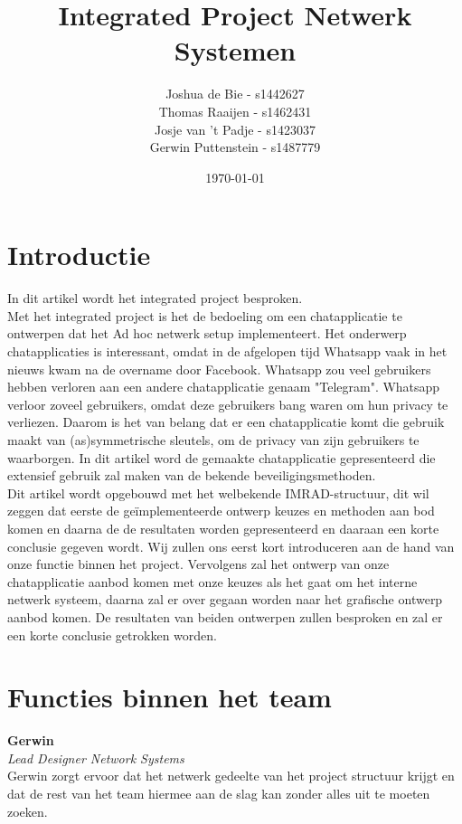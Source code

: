 \documentclass[12pt]{article}
\author{Joshua de Bie - s1442627\\Thomas Raaijen - s1462431\\Josje van 't Padje - s1423037\\Gerwin Puttenstein - s1487779}
\date{\today}
\title{Integrated Project Netwerk Systemen}
\begin{document}
\maketitle
\thispagestyle{empty}
\setcounter{page}{0}
\newpage

\tableofcontents
\newpage

\section{Introductie}
In dit artikel wordt het integrated project besproken.\\ Met het integrated project is het de bedoeling om een chatapplicatie te ontwerpen dat het Ad hoc netwerk setup implementeert. Het onderwerp chatapplicaties is interessant, omdat in de afgelopen tijd Whatsapp vaak in het nieuws kwam na de overname door Facebook. Whatsapp zou veel gebruikers hebben verloren aan een andere chatapplicatie genaam "Telegram". Whatsapp verloor zoveel gebruikers, omdat deze gebruikers bang waren om hun privacy te verliezen. Daarom is het van belang dat er een chatapplicatie komt die gebruik maakt van (as)symmetrische sleutels, om de privacy van zijn gebruikers te waarborgen. In dit artikel word de gemaakte chatapplicatie gepresenteerd die extensief gebruik zal maken van de bekende beveiligingsmethoden.\\
Dit artikel wordt opgebouwd met het welbekende IMRAD-structuur, dit wil zeggen dat eerste de ge\"implementeerde ontwerp keuzes en methoden aan bod komen en daarna de de resultaten worden gepresenteerd en daaraan een korte conclusie gegeven wordt. Wij zullen ons eerst kort introduceren aan de hand van onze functie binnen het project. Vervolgens zal het ontwerp van onze chatapplicatie aanbod komen met onze keuzes als het gaat om het interne netwerk systeem, daarna zal er over gegaan worden naar het grafische ontwerp aanbod komen. De resultaten van beiden ontwerpen zullen besproken en zal er een korte conclusie getrokken worden. 
\newpage

\section{Functies binnen het team}
\textbf{Gerwin} \\
\emph{Lead Designer Network Systems} \\
Gerwin zorgt ervoor dat het netwerk gedeelte van het project structuur krijgt en dat de rest van het team hiermee aan de slag kan zonder alles uit te moeten zoeken.
\\
\end{document}
